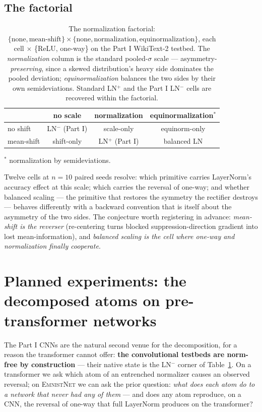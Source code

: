 \documentclass[11pt]{article}
\newcommand{\modelEmnistNet}{\textsc{EmnistNet}\xspace}
\begin{document}
\subsection{The factorial}

\begin{table}[H]
\centering
\caption{The normalization factorial:
$\{\text{none}, \text{mean-shift}\} \times \{\text{none},
\text{normalization}, \text{equinormalization}\}$, each cell
$\times$ \{ReLU, one-way\} on the Part I WikiText-2 testbed. The
\emph{normalization} column is the standard pooled-$\sigma$ scale
--- asymmetry-\emph{preserving}, since a skewed distribution's heavy
side dominates the pooled deviation; \emph{equinormalization}
balances the two sides by their own semideviations. Standard
LN$^{+}$ and the Part I LN$^{-}$ cells are recovered within the
factorial.}
\label{tab:lnfactorial}
\begin{tabular}{lccc}
\toprule
 & no scale & normalization & equinormalization$^{*}$ \\
\midrule
no shift   & LN$^{-}$ (Part I) & scale-only & equinorm-only \\
mean-shift & shift-only & LN$^{+}$ (Part I) & balanced LN \\
\bottomrule
\end{tabular}

{\footnotesize $^{*}$ normalization by semideviations.}
\end{table}

Twelve cells at $n{=}10$ paired seeds resolve: which primitive
carries LayerNorm's accuracy effect at this scale; which carries the
reversal of one-way; and whether balanced scaling --- the primitive
that restores the symmetry the rectifier destroys --- behaves
differently with a backward convention that is itself about the
asymmetry of the two sides. The conjecture worth registering in
advance: \emph{mean-shift is the reverser} (re-centering turns
blocked suppression-direction gradient into lost mean-information),
and \emph{balanced scaling is the cell where one-way and
normalization finally cooperate}.

\section{Planned experiments: the decomposed atoms on
pre-transformer networks}
\label{sec:cnn-atoms}

The Part I CNNs are the natural second venue for the decomposition,
for a reason the transformer cannot offer: \textbf{the
convolutional testbeds are norm-free by construction} --- their
native state is the LN$^{-}$ corner of
Table~\ref{tab:lnfactorial}. On a transformer we ask which atom of
an entrenched normalizer causes an observed reversal; on
\modelEmnistNet{} we can ask the prior question: \emph{what does
each atom do to a network that never had any of them} --- and does
any atom reproduce, on a CNN, the reversal of one-way that full
LayerNorm produces on the transformer?
\end{document}
